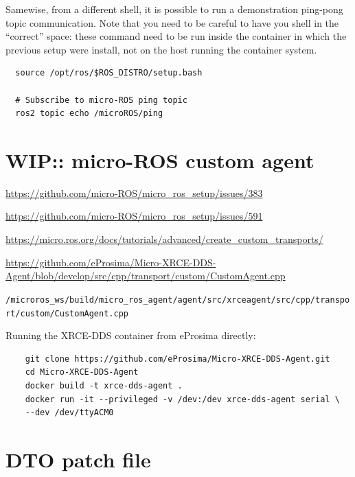 \documentclass[10pt]{article}
\begin{document}
Samewise, from a different shell, it is possible to run a demonstration ping-pong topic communication.
Note that you need to be careful to have you shell in the ``correct'' space: these command need to be run inside
the container in which the previous setup were install, not on the host running the container system.
\begin{tcolorbox}
\begin{verbatim}
  source /opt/ros/$ROS_DISTRO/setup.bash
  
  # Subscribe to micro-ROS ping topic
  ros2 topic echo /microROS/ping
\end{verbatim}
\end{tcolorbox}

\section{WIP:: micro-ROS custom agent}

\url{https://github.com/micro-ROS/micro_ros_setup/issues/383}

\url{https://github.com/micro-ROS/micro_ros_setup/issues/591}

\url{https://micro.ros.org/docs/tutorials/advanced/create_custom_transports/}

\url{https://github.com/eProsima/Micro-XRCE-DDS-Agent/blob/develop/src/cpp/transport/custom/CustomAgent.cpp}

\verb|/microros_ws/build/micro_ros_agent/agent/src/xrceagent/src/cpp/transport/custom/CustomAgent.cpp|


Running the XRCE-DDS container from eProsima directly:
\begin{tcolorbox}
  \begin{verbatim}
    git clone https://github.com/eProsima/Micro-XRCE-DDS-Agent.git
    cd Micro-XRCE-DDS-Agent
    docker build -t xrce-dds-agent .
    docker run -it --privileged -v /dev:/dev xrce-dds-agent serial \
    --dev /dev/ttyACM0
  \end{verbatim}
\end{tcolorbox}


\pagebreak
\appendix
\section{DTO patch file}
\label{sec:DTO patch file}
\inputminted[linenos]{diff}{./src/system.patch}
\end{document}
